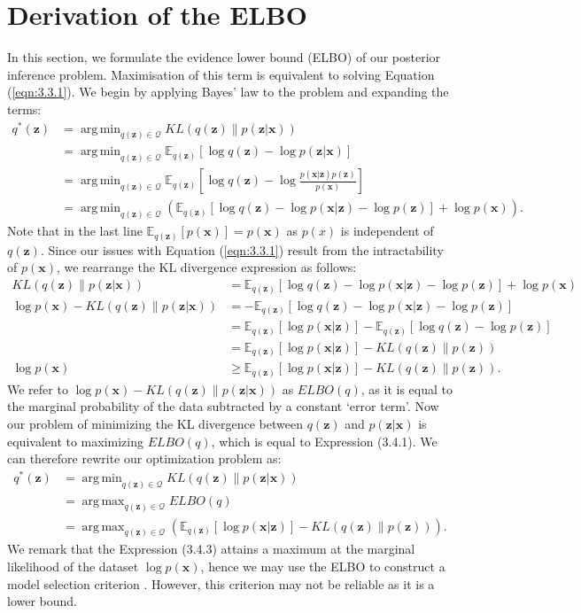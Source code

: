 \documentclass[honours,12pt]{unswthesis}
\DeclareMathOperator*{\argmin}{arg\,min}
\DeclareMathOperator*{\argmax}{arg\,max}
\numberwithin{equation}{section}
\theoremstyle{definition}
\begin{document}
\section{Derivation of the ELBO}\label{sec:3.4}
In this section, we formulate the evidence lower bound (ELBO) of our posterior inference problem. Maximisation of this term is equivalent to solving Equation (\ref{eqn:3.3.1}). We begin by applying Bayes' law to the problem and expanding the terms:
\begin{align*}
q^*(\bm{z})&=\argmin_{q(\bm{z})\in \mathcal{Q}}KL(q(\bm{z})\|p(\bm{z}|\bm{x}))\\
&= \argmin_{q(\bm{z})\in \mathcal{Q}} \mathbb{E}_{q(\bm{z})}[\log q(\bm{z})-\log p(\bm{z}|\bm{x})]\\
&= \argmin_{q(\bm{z})\in \mathcal{Q}} \mathbb{E}_{q(\bm{z})}\left[\log q(\bm{z})-\log\frac{p(\bm{x}|\bm{z})p(\bm{z})}{p(\bm{x})}\right]\\
&= \argmin_{q(\bm{z})\in \mathcal{Q}} \left(\mathbb{E}_{q(\bm{z})}[\log q(\bm{z})-\log p(\bm{x}|\bm{z})-\log p(\bm{z})]+\log p(\bm{x})\right).
\end{align*}
Note that in the last line $\mathbb{E}_{q(\bm{z})}[p(\bm{x})]=p(\bm{x})$ as $p(x)$ is independent of $q(\bm{z})$. Since our issues with Equation (\ref{eqn:3.3.1}) result from the intractability of $p(\bm{x})$, we rearrange the KL divergence expression as follows:
\begin{align}
KL(q(\bm{z})\|p(\bm{z}|\bm{x}))&=\mathbb{E}_{q(\bm{z})}[\log q(\bm{z})-\log p(\bm{x}|\bm{z})-\log p(\bm{z})]+\log p(\bm{x}) \nonumber \\
\log p(\bm{x})-KL(q(\bm{z})\|p(\bm{z}|\bm{x}))&=-\mathbb{E}_{q(\bm{z})}[\log q(\bm{z})-\log p(\bm{x}|\bm{z})-\log p(\bm{z})]\nonumber \\
&=\mathbb{E}_{q(\bm{z})}[\log p(\bm{x}|\bm{z})]-\mathbb{E}_{q(\bm{z})}[\log q(\bm{z})-\log p(\bm{z})]\nonumber \\
&=\mathbb{E}_{q(\bm{z})}[\log p(\bm{x}|\bm{z})]-KL(q(\bm{z})\|p(\bm{z}))\\
\log p(\bm{x})&\geq \mathbb{E}_{q(\bm{z})}[\log p(\bm{x}|\bm{z})]-KL(q(\bm{z})\|p(\bm{z})).
\end{align}
We refer to $\log p(\bm{x})-KL(q(\bm{z})\|p(\bm{z}|\bm{x}))$ as $ELBO(q)$, as it is equal to the marginal probability of the data subtracted by a constant `error term'. Now our problem of minimizing the KL divergence between $q(\bm{z})$ and $p(\bm{z}|\bm{x})$ is equivalent to maximizing $ELBO(q)$, which is equal to Expression (3.4.1). We can therefore rewrite our optimization problem as:
\begin{align}
q^*(\bm{z})&=\argmin_{q(\bm{z})\in \mathcal{Q}}KL(q(\bm{z})\|p(\bm{z}|\textbf{x}))\nonumber\\
&= \argmax_{q(\bm{z})\in \mathcal{Q}} ELBO(q)\nonumber\\
&= \argmax_{q(\bm{z})\in \mathcal{Q}} \left(\mathbb{E}_{q(\bm{z})}[\log p(\bm{x}|\bm{z})]-KL(q(\bm{z})\|p(\bm{z}))\right).
\end{align}
We remark that the Expression (3.4.3) attains a maximum at the marginal likelihood of the dataset $\log p(\bm{x})$, hence we may use the ELBO to construct a model selection criterion \citep{pattern}. However, this criterion may not be reliable as it is a lower bound.
\newpage
\end{document}
